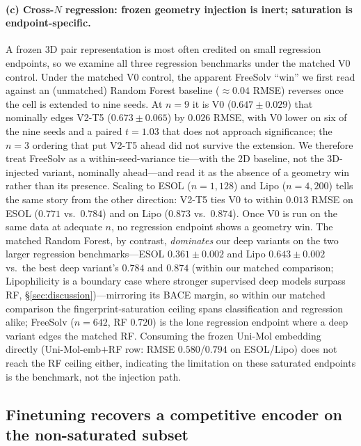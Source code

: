 \documentclass[sigconf,nonacm,anonymous,review]{acmart}
\begin{document}
\paragraph{(c) Cross-$N$ regression: frozen geometry injection is inert; saturation is endpoint-specific.}
\label{sec:crossN}
A frozen 3D pair representation is most often credited on small regression endpoints, so we examine all three regression benchmarks under the matched V0 control. Under the matched V0 control, the apparent FreeSolv ``win'' we first read against an (unmatched) Random Forest baseline ($\approx 0.04$ RMSE) reverses once the cell is extended to nine seeds. At $n{=}9$ it is V0 ($0.647 \pm 0.029$) that nominally edges V2-T5 ($0.673 \pm 0.065$) by $0.026$ RMSE, with V0 lower on six of the nine seeds and a paired $t{=}1.03$ that does not approach significance; the $n{=}3$ ordering that put V2-T5 ahead did not survive the extension. We therefore treat FreeSolv as a within-seed-variance tie---with the 2D baseline, not the 3D-injected variant, nominally ahead---and read it as the absence of a geometry win rather than its presence. Scaling to ESOL ($n{=}1{,}128$) and Lipo ($n{=}4{,}200$) tells the same story from the other direction: V2-T5 ties V0 to within $0.013$ RMSE on ESOL ($0.771$ vs.\ $0.784$) and on Lipo ($0.873$ vs.\ $0.874$). Once V0 is run on the same data at adequate $n$, no regression endpoint shows a geometry win. The matched Random Forest, by contrast, \emph{dominates} our deep variants on the two larger regression benchmarks---ESOL $0.361 \pm 0.002$ and Lipo $0.643 \pm 0.002$ vs.\ the best deep variant's $0.784$ and $0.874$ (within our matched comparison; Lipophilicity is a boundary case where stronger supervised deep models surpass RF, \S\ref{sec:discussion})---mirroring its BACE margin, so within our matched comparison the fingerprint-saturation ceiling spans classification and regression alike; FreeSolv ($n{=}642$, RF $0.720$) is the lone regression endpoint where a deep variant edges the matched RF. Consuming the frozen Uni-Mol embedding directly (Uni-Mol-emb$+$RF row: RMSE $0.580$/$0.794$ on ESOL/Lipo) does not reach the RF ceiling either, indicating the limitation on these saturated endpoints is the benchmark, not the injection path.

\subsection{Finetuning recovers a competitive encoder on the non-saturated subset}
\label{sec:finetune-correction}
\end{document}
